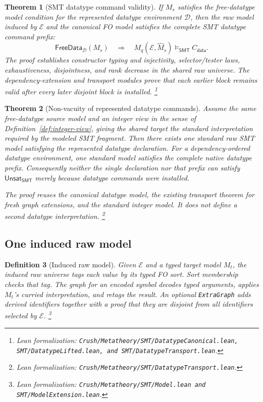 \documentclass[11pt]{article}
\newtheorem{definition}{Definition}[section]
\newtheorem{theorem}[definition]{Theorem}
\theoremstyle{remark}
\newcommand{\leanfile}[1]{\footnote{Lean formalization: \texttt{Crush/Metatheory/#1}.}}
\newcommand{\leanfiles}[1]{\footnote{Lean formalization: \texttt{Crush/Metatheory/#1}.}}
\newcommand{\smtsat}{\models_{\mathsf{SMT}}}
\newcommand{\unsat}{\mathsf{Unsat}}
\newcommand{\FreeDataModel}{\mathsf{FreeData}}
\begin{document}
\begin{theorem}[SMT datatype command validity]
If $M_s$ satisfies the free-datatype model condition for the represented
datatype environment $\mathcal D$, then
the raw model induced by $\mathcal E$ and the canonical FO model satisfies the
complete SMT datatype command prefix:
\[
 \FreeDataModel_{\mathcal D}(M_s)
 \quad\Longrightarrow\quad
 M_q(\mathcal E,\widehat M_s)\smtsat C_{\mathsf{data}}.
\]
The proof establishes constructor typing and injectivity, selector/tester laws,
exhaustiveness, disjointness, and rank decrease in the shared raw universe.
The dependency-extension and transport modules prove that each earlier block
remains valid after every later disjoint block is installed.
\leanfiles{SMT/DatatypeCanonical.lean, SMT/DatatypeLifted.lean, and SMT/DatatypeTransport.lean}
\end{theorem}

\begin{theorem}[Non-vacuity of represented datatype commands]
Assume the same free-datatype source model and an integer view in the sense of
Definition~\ref{def:integer-view}, giving the shared target the standard
interpretation required by the modeled SMT fragment. Then there exists one
\emph{standard} raw SMT model satisfying the
represented datatype declaration. For a dependency-ordered datatype
environment, one standard model satisfies the complete native datatype prefix.
Consequently neither the single declaration nor that prefix can satisfy
$\unsat_{\mathsf{SMT}}$ merely because datatype commands were installed.

The proof reuses the canonical datatype model, the existing transport theorem
for fresh graph extensions, and the standard integer model. It does not define
a second datatype interpretation.
\leanfile{SMT/DatatypeTransport.lean}
\end{theorem}

\subsection{One induced raw model}

\begin{definition}[Induced raw model]
Given $\mathcal E$ and a typed target model $M_t$, the induced raw universe
tags each value by its typed FO sort. Sort membership checks that tag. The
graph for an encoded symbol decodes typed arguments, applies $M_t$'s curried
interpretation, and retags the result. An optional \texttt{ExtraGraph} adds
derived identifiers together with a proof that they are disjoint from all
identifiers selected by $\mathcal E$.
\leanfiles{SMT/Model.lean and SMT/ModelExtension.lean}
\end{definition}
\end{document}
